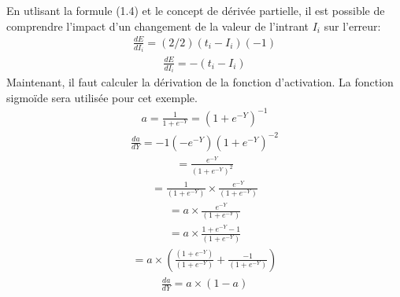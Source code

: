 \documentclass[letterpaper,10pt,french]{sphinxmanual}
\begin{document}
En utlisant la formule (1.4) et le concept de dérivée partielle, il est possible de comprendre l’impact d’un changement de la valeur de l’intrant \(I_i\) sur l’erreur:
\begin{equation*}
\begin{split}\frac{dE}{dI_i} =  (2/2)(t_i - I_i)(-1) \end{split}
\end{equation*}\begin{equation*}
\begin{split}\frac{dE}{dI_i}= -(t_i-I_i)\end{split}
\end{equation*}
Maintenant, il faut calculer la dérivation de la fonction d’activation.
La fonction sigmoïde sera utilisée pour cet exemple.
\begin{equation*}
\begin{split}a = \frac{1}{1 + e^{-Y}} =(1+e^{-Y})^{-1}\end{split}
\end{equation*}\begin{equation*}
\begin{split}\frac{da}{dY} = -1 (-e^{-Y})(1+e^{-Y})^{-2} \end{split}
\end{equation*}\begin{equation*}
\begin{split}= \frac{e^{-Y}}{(1+e^{-Y})^2} \end{split}
\end{equation*}\begin{equation*}
\begin{split}= \frac{1}{(1+e^{-Y})}\times\frac{e^{-Y}}{(1+e^{-Y})} \end{split}
\end{equation*}\begin{equation*}
\begin{split}= a \times \frac{e^{-Y}}{(1+e^{-Y})}\end{split}
\end{equation*}\begin{equation*}
\begin{split}= a \times \frac{1+e^{-Y}-1}{(1+e^{-Y})} \end{split}
\end{equation*}\begin{equation*}
\begin{split}= a \times (\frac{(1+e^{-Y})}{(1+e^{-Y})} + \frac{-1}{(1+e^{-Y})})\end{split}
\end{equation*}\begin{equation*}
\begin{split}\frac{da}{dY}= a \times (1-a)\end{split}
\end{equation*}
\end{document}
